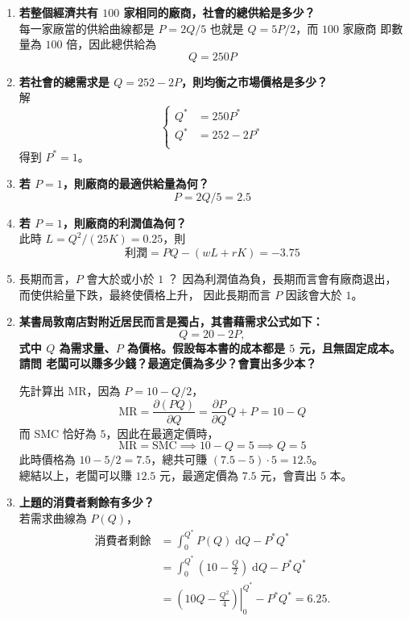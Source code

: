 \documentclass[12pt, a4paper]{article}
\newcommand{\dI}{\;\mathrm{d}}
\begin{document}
\begin{enumerate}[label={\bf 6.\arabic*}]
    \item {\bf 若整個經濟共有 $100$ 家相同的廠商，社會的總供給是多少？\\}
      每一家廠當的供給曲線都是 $P = 2Q / 5$ 也就是 $Q = 5P / 2$，而 $100$ 家廠商
      即數量為 $100$ 倍，因此總供給為
      \[ Q = 250P \]

    \item {\bf 若社會的總需求是 $Q = 252 - 2P$，則均衡之市場價格是多少？\\}
      解
      \[
        \left\{
          \begin{align*}
            Q^* &= 250P^* \\
            Q^* &= 252 - 2P^* \\
          \end{align*}
        \right.
      \]
      得到 $P^* = 1$。

    \item{\bf 若 $P = 1$，則廠商的最適供給量為何？}
      \[ P = 2Q / 5 = 2.5 \]

    \item{\bf 若 $P = 1$，則廠商的利潤值為何？\\}
      此時 $L = Q^2 / (25K) = 0.25$，則
      \[ \text{利潤} = PQ - (wL + rK) = -3.75 \]

    \item{長期而言，$P$ 會大於或小於 $1$ ？}
      因為利潤值為負，長期而言會有廠商退出，而使供給量下跌，最終使價格上升，
      因此長期而言 $P$ 因該會大於 $1$。
\end{enumerate}

\begin{enumerate}[label={\bf 7.\arabic*}]
    \setcounter{enumi}{1}
    \item {\bf 某書局敦南店對附近居民而言是獨占，其書藉需求公式如下：
        \[ Q = 20-2P, \]
      式中 $Q$ 為需求量、$P$ 為價格。假設每本書的成本都是 $5$ 元，且無固定成本。請問
      老闆可以賺多少錢？最適定價為多少？會賣出多少本？}

    先計算出 MR，因為 $P = 10 - Q/2$，
    \[ \text{MR} = \frac{\partial (PQ)}{\partial Q} = \frac{\partial P}{\partial Q}Q + P
      = 10 - Q \]
    而 SMC 恰好為 $5$，因此在最適定價時，
    \[ \text{MR} = \text{SMC} \implies 10 - Q = 5 \implies Q = 5 \]
    此時價格為 $10 - 5/2 = 7.5$，總共可賺 $(7.5 - 5) \cdot 5 = 12.5$。\\
    總結以上，老闆可以賺 $12.5$ 元，最適定價為 $7.5$ 元，會賣出 $5$ 本。
    
    \item {\bf 上題的消費者剩餘有多少？\\}
      若需求曲線為 $P(Q)$，
      \begin{align*}
        \text{消費者剩餘} &= \int_{0}^{Q^*} P(Q) \dI Q - P^* Q^*\\
        &= \int_{0}^{Q^*} \left(10 - \frac{Q}{2} \right) \dI Q - P^* Q^*\\
        &= \left. \left( 10Q - \frac{Q^2}{4} \right) \right|_{0}^{Q^*} - P^* Q^* = 6.25.
      \end{align*}
 
  \end{enumerate}
\end{document}
